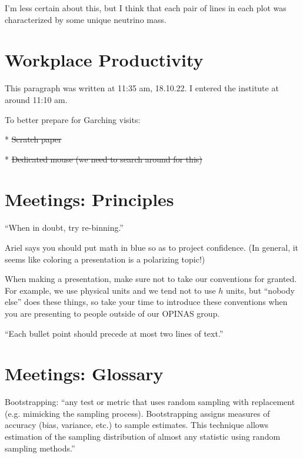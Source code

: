 \documentclass[11pt]{article}
\begin{document}
I'm less certain about this, but I think that each pair of lines in each plot
was characterized by some unique neutrino mass.





\section{Workplace Productivity}

This paragraph was written at 11:35 am, 18.10.22. I entered the institute at
around 11:10 am.

To better prepare for Garching visits:

* \sout{Scratch paper}

* \sout{Dedicated mouse (we need to search around for this)}

\section{Meetings: Principles}

``When in doubt, try re-binning.''

Ariel says you should put math in blue so as to project confidence. (In
general, it seems like coloring a presentation is a polarizing topic!)

When making a presentation, make sure not to take our conventions for granted.
For example, we use physical units and we tend not to use $h$ units, but
``nobody else'' does these things, so take your time to introduce these
conventions when you are presenting to people outside of our OPINAS group.

``Each bullet point should precede at most two lines of text.''

\section{Meetings: Glossary}

Bootstrapping: ``any test or metric that uses random sampling with replacement
(e.g. mimicking the sampling process). Bootstrapping assigns measures of
accuracy (bias, variance, etc.) to sample estimates. This technique allows
estimation of the sampling distribution of almost any statistic using random
sampling methods.''
\end{document}
